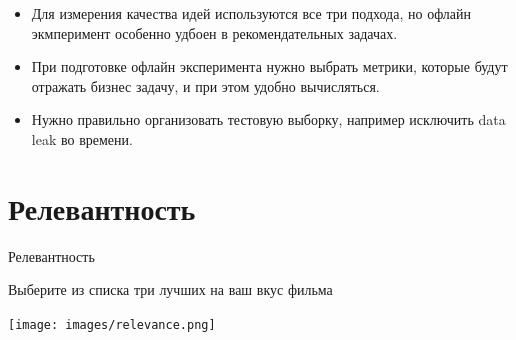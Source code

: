 \documentclass[11pt,aspectratio=169,handout]{beamer}
\begin{document}
\begin{frame}{}

\begin{tcolorbox}[colback=info!5,colframe=info!80,title=]
\begin{itemize}
\item Для измерения качества идей используются все три подхода, но офлайн экмперимент особенно удбоен в рекомендательных задачах.
\item При подготовке офлайн эксперимента нужно выбрать метрики, которые будут отражать бизнес задачу, и при этом удобно вычисляться.
\item Нужно правильно организовать тестовую выборку, например исключить data leak во времени.
\end{itemize}
\end{tcolorbox}

\end{frame}

\section{Релевантность}

\begin{frame}{Релевантность}

\begin{tcolorbox}[colback=info!5,colframe=info!80,title=]
Выберите из списка три лучших на ваш вкус фильма
\end{tcolorbox}

\begin{center}
\texttt{[image: images/relevance.png]}
\end{center}

\end{frame}
\end{document}
